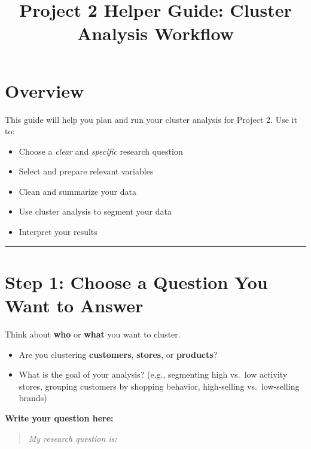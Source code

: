 \documentclass[
  11pt,
]{article}
\title{Project 2 Helper Guide: Cluster Analysis Workflow}
\author{}
\date{}
\providecommand{\tightlist}{%
  \setlength{\itemsep}{0pt}\setlength{\parskip}{0pt}}\usepackage{longtable,booktabs,array}
\begin{document}
\maketitle


\section*{Overview}\label{overview}

This guide will help you plan and run your cluster analysis for Project
2. Use it to:

\begin{itemize}
\tightlist
\item
  Choose a \emph{clear} and \emph{specific} research question
\item
  Select and prepare relevant variables
\item
  Clean and summarize your data
\item
  Use cluster analysis to segment your data
\item
  Interpret your results
\end{itemize}

\begin{center}\rule{0.5\linewidth}{0.5pt}\end{center}

\section*{Step 1: Choose a Question You Want to
Answer}\label{step-1-choose-a-question-you-want-to-answer}

Think about \textbf{who} or \textbf{what} you want to cluster.

\begin{itemize}
\item
  Are you clustering \textbf{customers}, \textbf{stores}, or
  \textbf{products}? \vspace{2em}
\item
  What is the goal of your analysis? (e.g., segmenting high vs.~low
  activity stores, grouping customers by shopping behavior, high-selling
  vs.~low-selling brands) \vspace{2em}
\end{itemize}

\textbf{Write your question here:}

\begin{quote}
\emph{My research question is:}
\end{quote}
\end{document}
